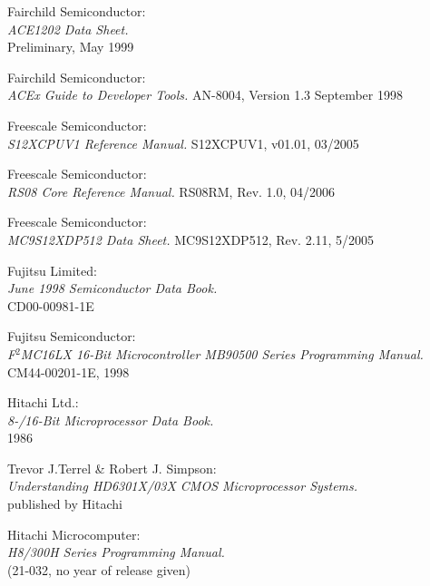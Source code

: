  Fairchild Semiconductor: \\
                   {\em ACE1202 Data Sheet.\/} \\
                   Preliminary, May 1999

 Fairchild Semiconductor: \\
                   {\em ACEx Guide to Developer Tools.\/}
                   AN-8004, Version 1.3 September 1998

 Freescale Semiconductor: \\
                  {\em S12XCPUV1 Reference Manual.\/}
                  S12XCPUV1, v01.01, 03/2005

 Freescale Semiconductor: \\
                  {\em RS08 Core Reference Manual.\/}
                  RS08RM, Rev. 1.0, 04/2006     

 Freescale Semiconductor: \\
                    {\em MC9S12XDP512 Data Sheet.\/}
                    MC9S12XDP512, Rev. 2.11, 5/2005

 Fujitsu Limited: \\
                    {\em June 1998 Semiconductor Data Book.\/} \\
                    CD00-00981-1E

 Fujitsu Semiconductor: \\
                    {\em F$^2$MC16LX 16-Bit Microcontroller MB90500 Series
                         Programming Manual.\/} \\
                    CM44-00201-1E, 1998

 Hitachi Ltd.: \\
                 {\em 8-/16-Bit Microprocessor Data Book.\/} \\
                 1986

 Trevor J.Terrel \& Robert J. Simpson: \\
                {\em Understanding HD6301X/03X CMOS Microprocessor
                 Systems.\/} \\
		published by Hitachi

 Hitachi Microcomputer: \\
                {\em H8/300H Series Programming Manual.\/} \\
                (21-032, no year of release given)

